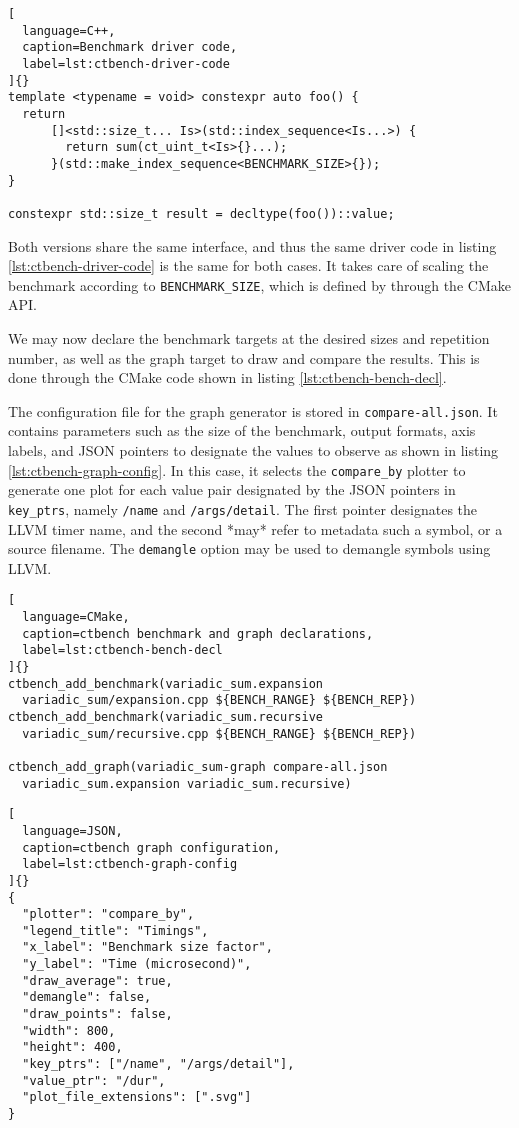 \documentclass[../main]{subfiles}
\begin{document}
\begin{lstlisting}[
  language=C++,
  caption=Benchmark driver code,
  label=lst:ctbench-driver-code
]{}
template <typename = void> constexpr auto foo() {
  return
      []<std::size_t... Is>(std::index_sequence<Is...>) {
        return sum(ct_uint_t<Is>{}...);
      }(std::make_index_sequence<BENCHMARK_SIZE>{});
}

constexpr std::size_t result = decltype(foo())::value;
\end{lstlisting}

Both versions share the same interface, and thus the same driver code in
listing \ref{lst:ctbench-driver-code} is the same for both cases.
It takes care of scaling the benchmark according to \lstinline{BENCHMARK_SIZE},
which is defined by \ctbench through the CMake API.

We may now declare the benchmark targets at the desired sizes and
repetition number, as well as the graph target to draw and compare the results.
This is done through the CMake code shown in listing
\ref{lst:ctbench-bench-decl}.

The configuration file for the graph generator is stored in
\lstinline{compare-all.json}.
It contains parameters such as the size of the benchmark, output formats,
axis labels, and JSON pointers to designate the values to observe as shown in
listing \ref{lst:ctbench-graph-config}.
In this case, it selects the \lstinline{compare_by} plotter to generate one
plot for each value pair designated by the JSON pointers in
\lstinline{key_ptrs}, namely \lstinline{/name} and \lstinline{/args/detail}.
The first pointer designates the LLVM timer name, and the second *may* refer to
metadata such a \cpp symbol, or a \cpp source filename. The \lstinline{demangle}
option may be used to demangle \cpp symbols using LLVM.

\begin{lstlisting}[
  language=CMake,
  caption=ctbench benchmark and graph declarations,
  label=lst:ctbench-bench-decl
]{}
ctbench_add_benchmark(variadic_sum.expansion
  variadic_sum/expansion.cpp ${BENCH_RANGE} ${BENCH_REP})
ctbench_add_benchmark(variadic_sum.recursive
  variadic_sum/recursive.cpp ${BENCH_RANGE} ${BENCH_REP})

ctbench_add_graph(variadic_sum-graph compare-all.json
  variadic_sum.expansion variadic_sum.recursive)
\end{lstlisting}

\clearpage%

\begin{lstlisting}[
  language=JSON,
  caption=ctbench graph configuration,
  label=lst:ctbench-graph-config
]{}
{
  "plotter": "compare_by",
  "legend_title": "Timings",
  "x_label": "Benchmark size factor",
  "y_label": "Time (microsecond)",
  "draw_average": true,
  "demangle": false,
  "draw_points": false,
  "width": 800,
  "height": 400,
  "key_ptrs": ["/name", "/args/detail"],
  "value_ptr": "/dur",
  "plot_file_extensions": [".svg"]
}
\end{lstlisting}
\end{document}
